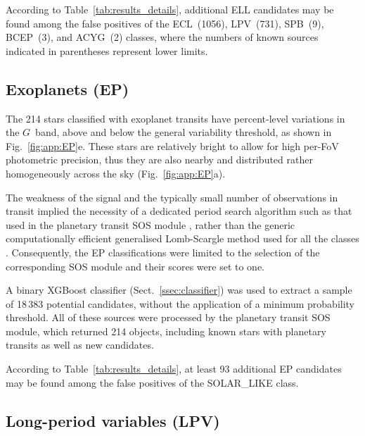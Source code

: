 \documentclass[longauth]{aa}
\def\g{$G$\xspace}
\begin{document}
According to Table~\ref{tab:results_details}, additional ELL candidates may be found among the false positives of the ECL~(1056), LPV~(731), SPB~(9), BCEP~(3), and ACYG~(2) classes, where the numbers of known sources indicated in parentheses represent lower limits.



\subsection{Exoplanets (EP)\label{ssec:ep}}

The 214 stars classified with exoplanet transits have percent-level variations in the \g~band, above and below the general variability threshold, as shown in Fig.~\ref{fig:app:EP}e. These stars are relatively bright to allow for high per-FoV photometric precision, thus they are also nearby and distributed rather homogeneously across the sky (Fig.~\ref{fig:app:EP}a).

The weakness of the signal and the typically small number of observations in transit implied the necessity of a dedicated period search algorithm such as that used in the planetary transit SOS module \citep{DR3-DPACP-181}, rather than the generic computationally efficient generalised
Lomb-Scargle method used for all the classes \citep{1985A&AS...59...63H,2009A&A...496..577Z}.
Consequently, the EP classifications were limited to the selection of the corresponding SOS module and their scores were set to one.


A binary XGBoost classifier (Sect.~\ref{ssec:classifier}) was used to extract a sample of 18\,383 potential candidates, without the application of a minimum probability threshold.  All of these sources were processed by the planetary transit SOS module, which returned 214 objects, including known stars with  planetary transits as well as new candidates.

According to Table~\ref{tab:results_details}, at least 93 additional EP candidates may be found among the false positives of the SOLAR\_LIKE class.



\subsection{Long-period variables (LPV)\label{ssec:lpv}}
\end{document}
